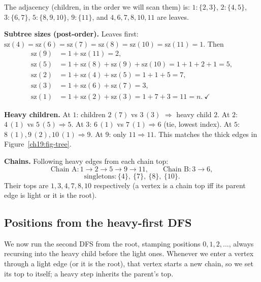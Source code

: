 The adjacency (children, in the order we will scan them) is:
$1\!:\{2,3\}$, $2\!:\{4,5\}$, $3\!:\{6,7\}$, $5\!:\{8,9,10\}$, $9\!:\{11\}$, and $4,6,7,8,10,11$ are
leaves.

\begin{labbox}
\textbf{Subtree sizes (post-order).} Leaves first: $\mathrm{sz}(4)=\mathrm{sz}(6)=\mathrm{sz}(7)=
\mathrm{sz}(8)=\mathrm{sz}(10)=\mathrm{sz}(11)=1$. Then
\begin{align*}
  \mathrm{sz}(9) &= 1+\mathrm{sz}(11)=2, \\
  \mathrm{sz}(5) &= 1+\mathrm{sz}(8)+\mathrm{sz}(9)+\mathrm{sz}(10)=1+1+2+1=5, \\
  \mathrm{sz}(2) &= 1+\mathrm{sz}(4)+\mathrm{sz}(5)=1+1+5=7, \\
  \mathrm{sz}(3) &= 1+\mathrm{sz}(6)+\mathrm{sz}(7)=3, \\
  \mathrm{sz}(1) &= 1+\mathrm{sz}(2)+\mathrm{sz}(3)=1+7+3=11 = n.\ \checkmark
\end{align*}

\textbf{Heavy children.} At $1$: children $2\,(7)$ vs $3\,(3)$ $\Rightarrow$ heavy child $2$. At $2$:
$4\,(1)$ vs $5\,(5)\Rightarrow 5$. At $3$: $6\,(1)$ vs $7\,(1)\Rightarrow 6$ (tie, lowest index). At
$5$: $8\,(1),9\,(2),10\,(1)\Rightarrow 9$. At $9$: only $11\Rightarrow 11$. This matches the thick
edges in Figure~\ref{ch19:fig-tree}.

\textbf{Chains.} Following heavy edges from each chain top:
\[
  \text{Chain A}: 1\!\to\!2\!\to\!5\!\to\!9\!\to\!11,\qquad
  \text{Chain B}: 3\!\to\!6,
\]
\[
  \text{singletons}: \{4\},\ \{7\},\ \{8\},\ \{10\}.
\]
Their tops are $1,3,4,7,8,10$ respectively (a vertex is a chain top iff its parent edge is light or it
is the root).
\end{labbox}

\subsection{Positions from the heavy-first DFS}

We now run the second DFS from the root, stamping positions $0,1,2,\dots$, always recursing into the
heavy child before the light ones. Whenever we enter a vertex through a light edge (or it is the root),
that vertex starts a new chain, so we set its $\mathrm{top}$ to itself; a heavy step inherits the
parent's $\mathrm{top}$.

